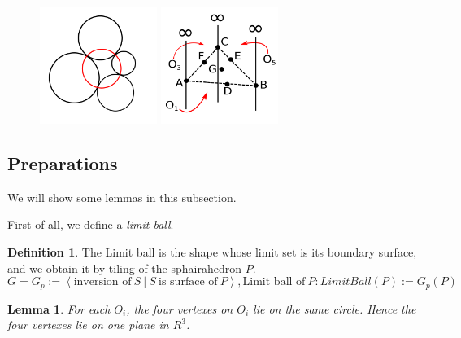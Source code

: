 \documentclass[suppldata, dvipdfmx]{interact}
\theoremstyle{plain}%
\newtheorem{lemma}[theorem]{Lemma}
\theoremstyle{definition}
\newtheorem{definition}[theorem]{Definition}
\theoremstyle{remark}
\theoremstyle{problemstyle}
\begin{document}
\begin{figure}[h!tbp]
 \begin{minipage}[t]{0.5\textwidth}
 \centering
 \includegraphics[width=1.5in, height=1.5in,
 keepaspectratio]{./img/HexahedraWithSphericalFaces/chain.png}
 \caption{}
 \label{fig:chainCircles}
 \end{minipage}
 \hspace*{\fill}
 \begin{minipage}[t]{0.5\textwidth}
  \centering
  \includegraphics[width=1.5in, height=1.5in,
  keepaspectratio]{./img/HexahedraWithSphericalFaces/infTriangle.png}
  \caption{}
  \label{fig:infTriangle}
 \end{minipage}
 \hspace*{\fill}
\end{figure}

\subsection{Preparations}

We will show some lemmas in this subsection.

First of all, we define a \textit{limit ball}.
\begin{definition}
 The Limit ball is the shape whose limit set is its boundary surface,
 and we obtain it by tiling of the sphairahedron $P$.
$$
 G = G_p := \left< \text{inversion of}~ S~|~S~\text{is surface of}~P
 \right>,
 \text{Limit ball of}~P : LimitBall(P) := G_p(P)
$$
\end{definition}

\begin{lemma}\label{sameCircle}
For each $O_i$, the four vertexes on $O_i$ lie on the same circle.
Hence the four vertexes lie on one plane in $R^3$.
\end{lemma}
\end{document}
